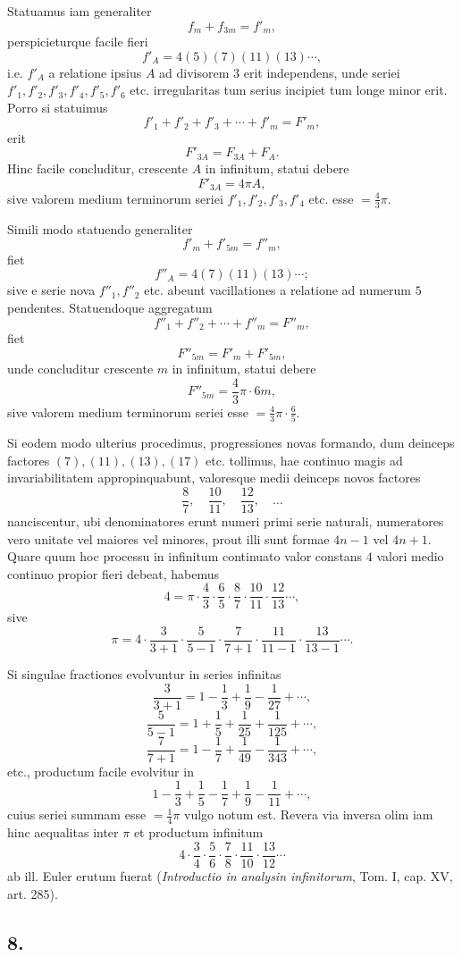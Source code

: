 \documentclass[12pt]{article}
\begin{document}
Statuamus iam generaliter
\[
f_m+f_{3m}=f'_m,
\]
perspicieturque facile fieri
\[
f'_A=4(5)(7)(11)(13)\cdots,
\]
i.e. $f'_A$ a relatione ipsius $A$ ad divisorem $3$ erit independens, unde seriei $f'_1,f'_2,f'_3,f'_4,f'_5,f'_6$ etc. irregularitas tum serius incipiet tum longe minor erit. Porro si statuimus
\[
f'_1+f'_2+f'_3+\cdots+f'_m=F'_m,
\]
erit
\[
F'_{3A}=F_{3A}+F_A.
\]
Hinc facile concluditur, crescente $A$ in infinitum, statui debere
\[
F'_{3A}=4\pi A,
\]
sive valorem medium terminorum seriei $f'_1,f'_2,f'_3,f'_4$ etc. esse $=\frac43\pi$.

Simili modo statuendo generaliter
\[
f'_m+f'_{5m}=f''_m,
\]
fiet
\[
f''_A=4(7)(11)(13)\cdots;
\]
sive e serie nova $f''_1,f''_2$ etc. abeunt vacillationes a relatione ad numerum $5$ pendentes. Statuendoque aggregatum
\[
f''_1+f''_2+\cdots+f''_m=F''_m,
\]
fiet
\[
F''_{5m}=F'_m+F'_{5m},
\]
unde concluditur crescente $m$ in infinitum, statui debere
\[
F''_{5m}=\frac43\pi\cdot 6m,
\]
sive valorem medium terminorum seriei esse $=\frac43\pi\cdot \frac65$.

Si eodem modo ulterius procedimus, progressiones novas formando, dum deinceps factores $(7),(11),(13),(17)$ etc. tollimus, hae continuo magis ad invariabilitatem appropinquabunt, valoresque medii deinceps novos factores
\[
\frac87,\quad \frac{10}{11},\quad \frac{12}{13},\quad \ldots
\]
nanciscentur, ubi denominatores erunt numeri primi serie naturali, numeratores vero unitate vel maiores vel minores, prout illi sunt formae $4n-1$ vel $4n+1$. Quare quum hoc processu in infinitum continuato valor constans $4$ valori medio continuo propior fieri debeat, habemus
\[
4=\pi\cdot \frac43\cdot\frac65\cdot\frac87\cdot\frac{10}{11}\cdot\frac{12}{13}\cdots,
\]
sive
\[
\pi=4\cdot\frac{3}{3+1}\cdot\frac{5}{5-1}\cdot\frac{7}{7+1}\cdot\frac{11}{11-1}\cdot\frac{13}{13-1}\cdots.
\]

Si singulae fractiones evolvuntur in series infinitas
\[
\frac{3}{3+1}=1-\frac13+\frac1{9}-\frac1{27}+\cdots,
\]
\[
\frac{5}{5-1}=1+\frac15+\frac1{25}+\frac1{125}+\cdots,
\]
\[
\frac{7}{7+1}=1-\frac17+\frac1{49}-\frac1{343}+\cdots,
\]
etc., productum facile evolvitur in
\[
1-\frac13+\frac15-\frac17+\frac19-\frac1{11}+\cdots,
\]
cuius seriei summam esse $=\frac14\pi$ vulgo notum est. Revera via inversa olim iam hinc aequalitas inter $\pi$ et productum infinitum
\[
4\cdot\frac34\cdot\frac56\cdot\frac78\cdot\frac{11}{10}\cdot\frac{13}{12}\cdots
\]
ab ill. Euler erutum fuerat (\emph{Introductio in analysin infinitorum}, Tom. I, cap. XV, art. 285).

\subsection*{8.}
\end{document}
